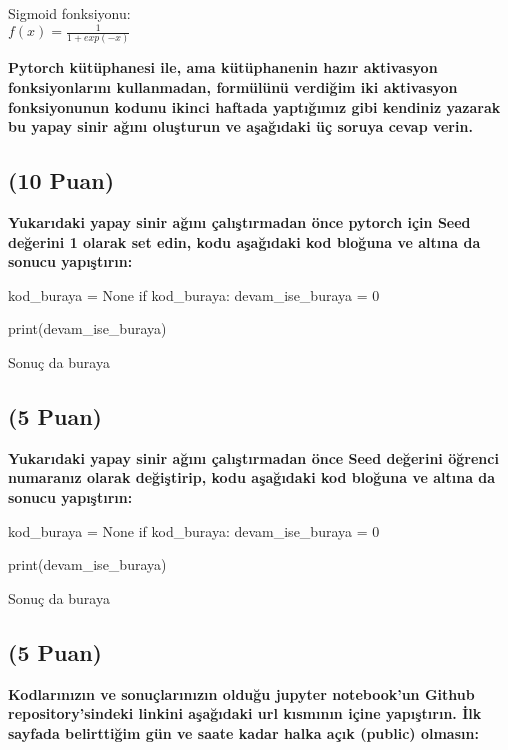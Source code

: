 \documentclass[11pt]{article}
\begin{document}
Sigmoid fonksiyonu:\\
$f(x) = \frac{1}{1 + exp(-x)}$

\vspace{.2in}
 \textbf{Pytorch kütüphanesi ile, ama kütüphanenin hazır aktivasyon fonksiyonlarını kullanmadan, formülünü verdiğim iki aktivasyon fonksiyonunun kodunu ikinci haftada yaptığımız gibi kendiniz yazarak bu yapay sinir ağını oluşturun ve aşağıdaki üç soruya cevap verin.}
 
\subsection{(10 Puan)} \textbf{Yukarıdaki yapay sinir ağını çalıştırmadan önce pytorch için Seed değerini 1 olarak set edin, kodu aşağıdaki kod bloğuna ve altına da sonucu yapıştırın:}

\begin{python}
kod_buraya = None
if kod_buraya:
    devam_ise_buraya = 0

print(devam_ise_buraya)
\end{python}

Sonuç da buraya

\subsection{(5 Puan)} \textbf{Yukarıdaki yapay sinir ağını çalıştırmadan önce Seed değerini öğrenci numaranız olarak değiştirip, kodu aşağıdaki kod bloğuna ve altına da sonucu yapıştırın:}

\begin{python}
kod_buraya = None
if kod_buraya:
    devam_ise_buraya = 0

print(devam_ise_buraya)
\end{python}

Sonuç da buraya

\subsection{(5 Puan)} \textbf{Kodlarınızın ve sonuçlarınızın olduğu jupyter notebook'un Github repository'sindeki linkini aşağıdaki url kısmının içine yapıştırın. İlk sayfada belirttiğim gün ve saate kadar halka açık (public) olmasın:}
\end{document}
